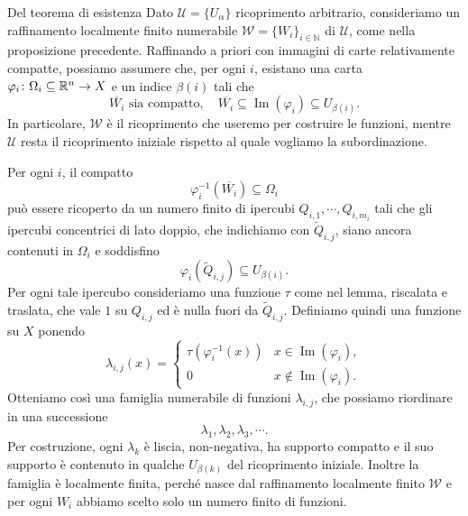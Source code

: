 \documentclass[a4paper]{article}
\begin{document}
\begin{snippetproof}{Del teorema di esistenza}
    Dato \(\mathcal U = \{U_\alpha\}\)
    ricoprimento arbitrario, consideriamo un raffinamento localmente finito
    numerabile \(\mathcal W = \{W_i\}_{i \in \mathbb N}\)
    di \(\mathcal U\), come nella proposizione precedente.
    Raffinando a priori con immagini di carte relativamente compatte,
    possiamo assumere che, per ogni \(i\), esistano una carta
    \(\varphi_i \colon \Omega_i \subseteq \mathbb{R}^n \to X\)
    e un indice \(\beta(i)\) tali che \[
        \overline{W_i} \text{ sia compatto}, \quad
        \overline{W_i} \subseteq \operatorname{Im}(\varphi_i)
        \subseteq U_{\beta(i)}.
    \]
    In particolare, \(\mathcal W\) è il ricoprimento che useremo per costruire
    le funzioni, mentre \(\mathcal U\) resta il ricoprimento iniziale
    rispetto al quale vogliamo la subordinazione.

    Per ogni \(i\), il compatto
    \[
        \varphi_i^{-1}(\overline{W_i}) \subseteq \Omega_i
    \]
    può essere ricoperto da un numero finito di ipercubi \(Q_{i,1}, \cdots, Q_{i,m_i}\)
    tali che gli ipercubi concentrici di lato doppio, che indichiamo con
    \(\widetilde{Q}_{i,j}\), siano ancora contenuti in \(\Omega_i\) e soddisfino \[
        \varphi_i(\widetilde{Q}_{i,j}) \subseteq U_{\beta(i)}.
    \]
    Per ogni tale ipercubo consideriamo una funzione \(\tau\)
    come nel lemma, riscalata e traslata, che vale \(1\) su \(Q_{i,j}\)
    ed è nulla fuori da \(\widetilde{Q}_{i,j}\).
    Definiamo quindi una funzione su \(X\) ponendo \[
        \lambda_{i,j}(x) =
        \begin{cases}
            \tau\left(\varphi_i^{-1}(x)\right) & x \in \operatorname{Im}(\varphi_i), \\
            0 & x \notin \operatorname{Im}(\varphi_i).
        \end{cases}
    \]
    Otteniamo così una famiglia numerabile di funzioni \(\lambda_{i,j}\),
    che possiamo riordinare in una successione \[
        \lambda_1, \lambda_2, \lambda_3, \cdots.
    \]
    Per costruzione, ogni \(\lambda_k\) è liscia, non-negativa,
    ha supporto compatto e il suo supporto è contenuto in qualche
    \(U_{\beta(k)}\) del ricoprimento iniziale. Inoltre la famiglia
    è localmente finita, perché nasce dal raffinamento localmente finito
    \(\mathcal W\) e per ogni \(W_i\) abbiamo scelto solo un numero finito
    di funzioni.


\end{snippetproof}
\end{document}
